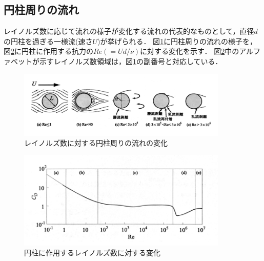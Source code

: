 \documentclass[a4paper,11pt,uplatex]{jsarticle}
\begin{document}
\subsection{円柱周りの流れ\cite{s3}}
レイノルズ数に応じて流れの様子が変化する流れの代表的なものとして，直径$d$の円柱を過ぎる一様流(速さ$U$)が挙げられる．
図\ref{図2:変化}に円柱周りの流れの様子を，図\ref{抗力変化}に円柱に作用する抗力の$Re(=Ud/\nu)$に対する変化を示す．
図\ref{抗力変化}中のアルファベットが示すレイノルズ数領域は，図\ref{図2:変化}の副番号と対応している．


\begin{figure}[H]
  \begin{center}
    \includegraphics[width = 10cm]{pic/流れの変化.png}
    \caption{レイノルズ数に対する円柱周りの流れの変化\cite{s3}}
    \label{図2:変化}
  \end{center}
\end{figure}
\begin{figure}[H]
  \begin{center}
    \includegraphics[width = 10cm]{pic/抗力.png}
    \caption{円柱に作用するレイノルズ数に対する変化\cite{s3}}
    \label{抗力変化}
  \end{center}
\end{figure}
\end{document}
